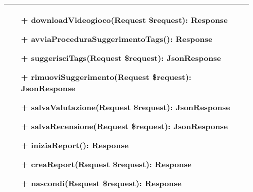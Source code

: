\begin{tabular}{|| l | p{28em} ||}
\begin{itemize}
		\item[+] downloadVideogioco(Request \$request): Response
		\item[+] avviaProceduraSuggerimentoTags(): Response
		\item[+] suggerisciTags(Request \$request): JsonResponse
		\item[+] rimuoviSuggerimento(Request \$request): JsonResponse
		\item[+] salvaValutazione(Request \$request): JsonResponse
		\item[+] salvaRecensione(Request \$request): JsonResponse
		\item[+] iniziaReport(): Response
		\item[+] creaReport(Request \$request): Response
		\item[+] nascondi(Request \$request): Response
	\end{itemize}\\
	\hline
\end{tabular}

\newpage
